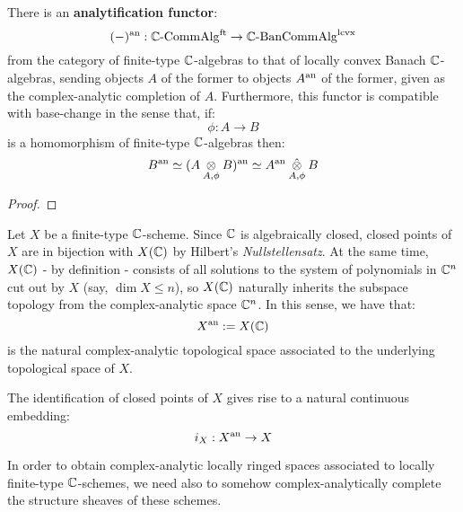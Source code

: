             \begin{lemma} \label{lemma: complex_analytic_completions_of_finite_type_C_algebras}
                There is an \textbf{analytification functor}:
                    $$(-)^{\mathrm{an}}: \mathbb{C}\text{-}\mathrm{Comm}\mathrm{Alg}^{\mathrm{ft}} \to \mathbb{C}\text{-}\mathrm{Ban}\mathrm{Comm}\mathrm{Alg}^{\mathrm{lcvx}}$$
                from the category of finite-type $\mathbb{C}$-algebras to that of locally convex Banach $\mathbb{C}$-algebras, sending objects $A$ of the former to objects $A^{\mathrm{an}}$ of the former, given as the complex-analytic completion of $A$. Furthermore, this functor is compatible with base-change in the sense that, if:
                    $$\phi: A \to B$$
                is a homomorphism of finite-type $\mathbb{C}$-algebras then:
                    $$B^{\an} \cong (A \tensor_{A, \phi} B)^{\an} \cong A^{\an} \hattensor_{A, \phi} B$$
            \end{lemma}
                \begin{proof}
                    
                \end{proof}
            \begin{remark} \label{remark: associated_complex_analytic_topological_spaces}
                Let $X$ be a finite-type $\mathbb{C}$-scheme. Since $\mathbb{C}$ is algebraically closed, closed points of $X$ are in bijection with $X(\mathbb{C})$ by Hilbert's \textit{Nullstellensatz}. At the same time, $X(\mathbb{C})$ - by definition - consists of all solutions to the system of polynomials in $\mathbb{C}^n$ cut out by $X$ (say, $\dim X \leq n$), so $X(\mathbb{C})$ naturally inherits the subspace topology from the complex-analytic space $\mathbb{C}^n$. In this sense, we have that:
                    $$X^{\mathrm{an}} := X(\mathbb{C})$$
                is the natural complex-analytic topological space associated to the underlying topological space of $X$.

                The identification of closed points of $X$ gives rise to a natural continuous embedding:
                    $$i_X: X^{\mathrm{an}} \to X$$
            \end{remark}
            In order to obtain complex-analytic locally ringed spaces associated to locally finite-type $\mathbb{C}$-schemes, we need also to somehow complex-analytically complete the structure sheaves of these schemes. 
